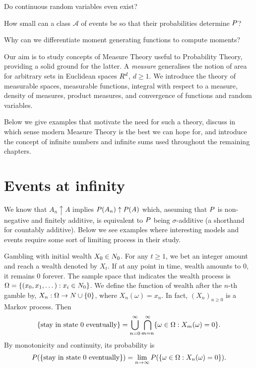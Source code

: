 \documentclass[
]{book}
\theoremstyle{definition}
\theoremstyle{remark}
\newenvironment{example}{\pushQED{\qed}\renewcommand{\qedsymbol}{\scriptsize$\triangle$}\examplex}{\popQED\endexamplex}
\let\mathbb\relax %
\newcommand{\N}{\mathbb{N}}
\newcommand{\Pb}{\mathbb{P}}
\newcommand{\cA}{\mathcal{A}}
\renewcommand*{\geq}{\geqslant}
\begin{document}
Do continuous random variables even exist?

How small can a class \(\cA\) of events be so that their probabilities
determine \(\Pb\)?

Why can we differentiate moment generating functions to compute moments?

Our aim is to study concepts of Measure Theory useful to Probability
Theory, providing a solid ground for the latter. A \emph{measure} generalises
the notion of area for arbitrary sets in Euclidean spaces
\(\mathbb{R}^d\), \(d \geq 1\). We introduce the theory of measurable
spaces, measurable functions, integral with respect to a measure,
density of measures, product measures, and convergence of functions and
random variables.

Below we give examples that motivate the need for such a theory, discuss
in which sense modern Measure Theory is the best we can hope for, and
introduce the concept of infinite numbers and infinite sums used
throughout the remaining chapters.

\hypertarget{sub:eventsinfty}{%
\section{Events at infinity}\label{sub:eventsinfty}}

We know that \(A_n \uparrow A\) implies \(\Pb(A_n) \uparrow \Pb(A)\) which,
assuming that \(\Pb\) is non-negative and finitely additive, is equivalent
to \(\Pb\) being \(\sigma\)-additive (a shorthand for countably additive).
Below we see examples where interesting models and events require some
sort of limiting process in their study.

\begin{example}[Ruin Probability]
Gambling with initial wealth \(X_0 \in \mathbb{N}_0\). For any \(t \geq 1\),
we bet an integer amount and reach a wealth denoted by \(X_t\). If at any
point in time, wealth amounts to \(0\), it remains \(0\) forever. The sample
space that indicates the wealth process is
\(\Omega = \{(x_0, x_1, \dots): x_i \in \N_0 \}\). We define the function
of wealth after the \(n\)-th gamble by,
\(X_n : \Omega \to \mathbb{N}\cup\{0\}\), where \(X_n(\omega) = x_n\). In
fact, \((X_n)_{n \geq 0}\) is a Markov process. Then
\[\{ \text{stay in state $ 0 $ eventually} \}
= \bigcup_{n=0}^{\infty}\bigcap_{m = n}^{\infty}\{\omega \in \Omega: X_m(\omega) = 0\}.\]
By monotonicity and continuity, its probability is \[\Pb(
\{ \text{stay in state $ 0 $ eventually} \}
)
=
\lim_{n\to\infty}
\Pb(\{\omega \in \Omega: X_n(\omega) = 0\})
 .\]
\end{example}
\end{document}
